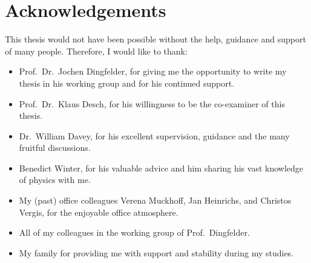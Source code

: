 \chapter{Acknowledgements}
\label{sec:ack}

This thesis would not have been possible without the help, guidance and support
of many people. Therefore, I would like to thank:
\begin{itemize}
\item Prof.\ Dr.\ Jochen Dingfelder, for giving me the opportunity to write my
  thesis in his working group and for his continued support.

\item Prof.\ Dr.\ Klaus Desch, for his willingness to be the co-examiner of this
  thesis.

\item Dr.\ William Davey, for his excellent supervision, guidance and the many
  fruitful discussions.

\item Benedict Winter, for his valuable advice and him sharing his vast
  knowledge of physics with me.

\item My (past) office colleagues Verena Muckhoff, Jan Heinrichs, and Christos
  Vergis, for the enjoyable office atmosphere.

\item All of my colleagues in the working group of Prof.\ Dingfelder.

\item My family for providing me with support and stability during my studies.

\end{itemize}



